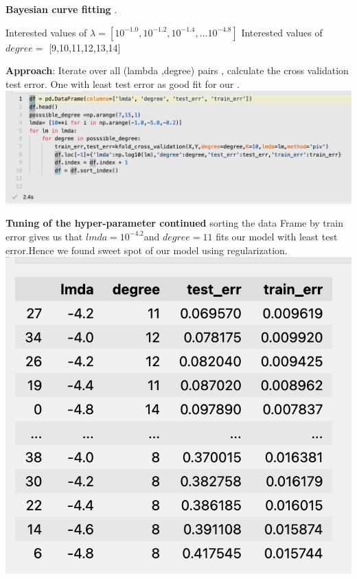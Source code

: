 \documentclass[11pt]{beamer}
\begin{document}
\begin{frame}
\textbf{Bayesian curve fitting} .


Interested values of $\lambda = [10^{-1.0},10^{-1.2},10^{-1.4},...10^{-4.8}]$
Interested values of $degree=$ [9,10,11,12,13,14]

\textbf{Approach}: Iterate over all (lambda ,degree) pairs , calculate the cross validation test error. One with least test error as good fit for our .
\includegraphics[scale=0.35]{images/29.png}

\end{frame}





\begin{frame}
\textbf{Tuning of the hyper-parameter continued}
sorting the data Frame by train error gives us that $lmda=10^{-4.2}$and $degree=11$ fits our model with least test error.Hence we found sweet spot of our model using regularization.
\\
\includegraphics[scale=0.35]{images/38.png}


\end{frame}
\end{document}

